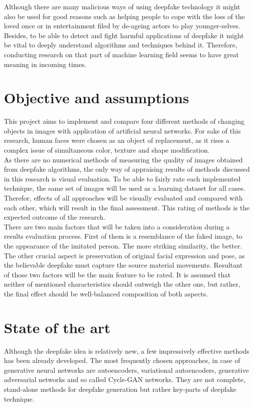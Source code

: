 Although there are many malicious ways of using deepfake technology it might also be used for good reasons such as helping people to cope with the loss of the loved once or in entertainment filed by de-ageing actors to play younger-selves. Besides, to be able to detect and fight harmful applications of deepfake it might be vital to deeply understand algorithms  and techniques behind it. Therefore, conducting research on that part of machine learning field seems to have great meaning in incoming times.

\section{Objective and assumptions}
This project aims to implement and compare four different methods of changing objects in images with application of artificial neural networks. For sake of this research, human faces were chosen as an object of replacement, as it rises a complex issue of simultaneous color, texture and shape modification.\\

As there are no numerical methods of measuring the quality of images obtained from deepfake algorithms, the only way of appraising results of methods discussed in this research is visual evaluation. To be able to fairly rate each implemented technique, the same set of images will be used as a learning dataset for all cases. Therefor, effects of all approaches will be visually evaluated and compared with each other, which will result in the final assessment. This rating of methods is the expected outcome of the research.\\

There are two main factors that will be taken into a consideration during a results evaluation process. First of them is a resemblance of the faked image, to the appearance of the imitated person. The more striking similarity, the better. The other crucial aspect is preservation of original facial expression and pose, as the believable deepfake must capture the source material movements. Resultant of those two factors will be the main feature to be rated. It is assumed that neither of mentioned characteristics should outweigh the other one, but rather, the final effect should be well-balanced composition of both aspects.

\section{State of the art}
Although the deepfake idea is relatively new, a few impressively effective methods has been already developed. The most frequently chosen approaches, in case of generative neural networks are autoencoders, variational autoencoders, generative adversarial networks and so called Cycle-GAN networks. They are not complete, stand-alone methods for deepfake generation but rather key-parts of deepfake technique.\\


